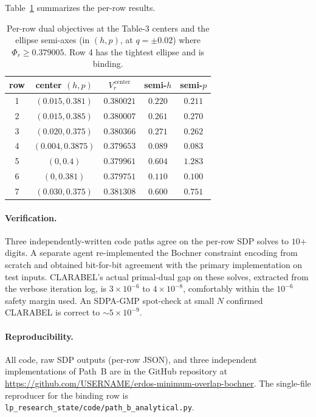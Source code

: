 \documentclass[11pt]{article}
\theoremstyle{plain}
\theoremstyle{definition}
\begin{document}
Table~\ref{tab:results} summarizes the per-row results.

\begin{table}[h]
\centering
\begin{tabular}{ccccc}
\toprule
row & center $(h, p)$ & $V_r^{\,\text{center}}$ & semi-$h$ & semi-$p$ \\
\midrule
1 & $(0.015, 0.381)$ & $0.380021$ & $0.220$ & $0.211$ \\
2 & $(0.015, 0.385)$ & $0.380007$ & $0.261$ & $0.270$ \\
3 & $(0.020, 0.375)$ & $0.380366$ & $0.271$ & $0.262$ \\
4 & $(0.004, 0.3875)$ & $0.379653$ & $0.089$ & $0.083$ \\
5 & $(0, 0.4)$ & $0.379961$ & $0.604$ & $1.283$ \\
6 & $(0, 0.381)$ & $0.379751$ & $0.110$ & $0.100$ \\
7 & $(0.030, 0.375)$ & $0.381308$ & $0.600$ & $0.751$ \\
\bottomrule
\end{tabular}
\caption{Per-row dual objectives at the Table-3 centers and the
ellipse semi-axes (in $(h, p)$, at $q = \pm 0.02$) where
$\Phi_r \ge 0.379005$. Row 4 has the tightest ellipse and is binding.}
\label{tab:results}
\end{table}

\paragraph{Verification.}
Three independently-written code paths agree on the per-row SDP solves
to $10$+ digits. A separate agent re-implemented the Bochner constraint
encoding from scratch and obtained bit-for-bit agreement with the
primary implementation on test inputs. CLARABEL's actual primal-dual
gap on these solves, extracted from the verbose iteration log, is
$3 \times 10^{-6}$ to $4 \times 10^{-8}$, comfortably within the
$10^{-6}$ safety margin used. An SDPA-GMP \cite{SDPA} spot-check at small
$N$ confirmed CLARABEL is correct to $\sim 5 \times 10^{-9}$.

\paragraph{Reproducibility.}
All code, raw SDP outputs (per-row JSON), and three independent
implementations of Path~B are in the GitHub repository at
\url{https://github.com/USERNAME/erdos-minimum-overlap-bochner}. The
single-file reproducer for the binding row is
\texttt{lp\_research\_state/code/path\_b\_analytical.py}.
\end{document}
